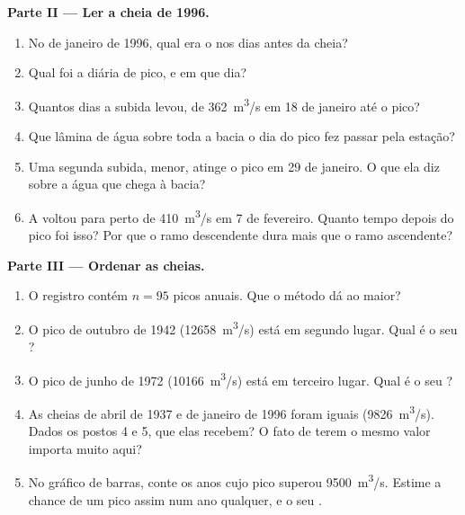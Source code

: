 \begin{problem}
\medskip
\noindent\textbf{Parte II --- Ler a cheia de 1996.}
\begin{enumerate}[resume]
  \item No  de janeiro de 1996, qual era o  nos
        dias antes da cheia?
  \item Qual foi a  diária de pico, e em que dia?
  \item Quantos dias a subida levou, de \qty{362}{m^3/s} em 18 de janeiro
        até o pico?
  \item Que lâmina de água sobre toda a bacia o dia do pico fez passar pela
        estação?
  \item Uma segunda subida, menor, atinge o pico em 29 de janeiro. O que ela
        diz sobre a água que chega à bacia?
  \item A  voltou para perto de \qty{410}{m^3/s} em 7 de fevereiro.
        Quanto tempo depois do pico foi isso? Por que o ramo descendente
        dura mais que o ramo ascendente?
\end{enumerate}

\medskip
\noindent\textbf{Parte III --- Ordenar as cheias.}
\begin{enumerate}[resume]
  \item O registro contém $n = 95$ picos anuais. Que  o
        método dá ao maior?
  \item O pico de outubro de 1942 (\qty{12658}{m^3/s}) está em segundo
        lugar. Qual é o seu ?
  \item O pico de junho de 1972 (\qty{10166}{m^3/s}) está em terceiro lugar.
        Qual é o seu ?
  \item As cheias de abril de 1937 e de janeiro de 1996 foram iguais
        (\qty{9826}{m^3/s}). Dados os postos 4 e 5, que 
        elas recebem? O fato de terem o mesmo valor importa muito aqui?
  \item No gráfico de barras, conte os anos cujo pico superou
        \qty{9500}{m^3/s}. Estime a chance de um pico assim num ano
        qualquer, e o seu .
\end{enumerate}


\end{problem}
